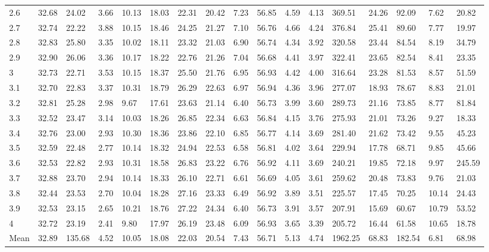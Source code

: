 \begin{adjustbox}{angle=90}
\begin{center}
\begin{tabular}{|l|llllllllllllllll|}
2.6&32.68&24.02&3.66&10.13&18.03&22.31&20.42&7.23&56.85&4.59&4.13&369.51&24.26&92.09&7.62&20.82  \\ 
2.7&32.74&22.22&3.88&10.15&18.46&24.25&21.27&7.10&56.76&4.66&4.24&376.84&25.41&89.60&7.77&19.97  \\ 
2.8&32.83&25.80&3.35&10.02&18.11&23.32&21.03&6.90&56.74&4.34&3.92&320.58&23.44&84.54&8.19&34.79  \\ 
2.9&32.90&26.06&3.36&10.17&18.22&22.76&21.26&7.04&56.68&4.41&3.97&322.41&23.65&82.54&8.41&23.35  \\ 
3&32.73&22.71&3.53&10.15&18.37&25.50&21.76&6.95&56.93&4.42&4.00&316.64&23.28&81.53&8.57&51.59  \\ 
3.1&32.70&22.83&3.37&10.31&18.79&26.29&22.63&6.97&56.94&4.36&3.96&277.07&18.93&78.67&8.83&21.01  \\ 
3.2&32.81&25.28&2.98&9.67&17.61&23.63&21.14&6.40&56.73&3.99&3.60&289.73&21.16&73.85&8.77&81.84  \\ 
3.3&32.52&23.47&3.14&10.03&18.26&26.85&22.34&6.63&56.84&4.15&3.76&275.93&21.01&73.26&9.27&18.33  \\ 
3.4&32.76&23.00&2.93&10.30&18.36&23.86&22.10&6.85&56.77&4.14&3.69&281.40&21.62&73.42&9.55&45.23  \\ 
3.5&32.59&22.48&2.77&10.14&18.32&24.94&22.53&6.58&56.81&4.02&3.64&229.94&17.78&68.71&9.85&45.66  \\ 
3.6&32.53&22.82&2.93&10.31&18.58&26.83&23.22&6.76&56.92&4.11&3.69&240.21&19.85&72.18&9.97&245.59  \\ 
3.7&32.88&23.70&2.94&10.14&18.33&26.10&22.71&6.61&56.69&4.05&3.61&259.62&20.48&73.83&9.76&21.03  \\ 
3.8&32.44&23.53&2.70&10.04&18.28&27.16&23.33&6.49&56.92&3.89&3.51&225.57&17.45&70.25&10.14&24.43  \\ 
3.9&32.53&23.15&2.65&10.21&18.76&27.22&24.34&6.40&56.73&3.91&3.57&207.91&15.69&60.67&10.79&53.52  \\ 
4&32.72&23.19&2.41&9.80&17.97&26.19&23.48&6.09&56.93&3.65&3.39&205.72&16.44&61.58&10.65&18.78  \\ \hline \hline
Mean&32.89&135.68&4.52&10.05&18.08&22.03&20.54&7.43&56.71&5.13&4.74&1962.25&68.83&182.54&6.81&68.98  \\ \hline
\end{tabular}
\end{center}
\end{adjustbox}





